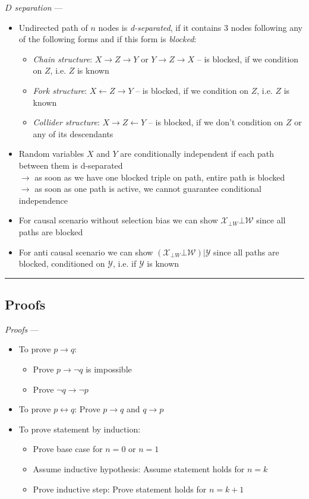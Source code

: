 \emph{$D$ separation} --- 
\begin{itemize}
    \item Undirected path of $n$ nodes is \emph{d-separated}, if it contains 3 nodes following any of the following forms and if this form is \emph{blocked}: 
    \begin{itemize}
        \item \emph{Chain structure}: $X \rightarrow Z \rightarrow Y$ or $Y \rightarrow Z \rightarrow X$ – is blocked, if we condition on $Z$, i.e. $Z$ is known
        \item \emph{Fork structure}: $X \leftarrow Z \rightarrow Y$ – is blocked, if we condition on $Z$, i.e. $Z$ is known
        \item \emph{Collider structure}: $X \rightarrow Z \leftarrow Y$ – is blocked, if we don't condition on $Z$ or any of its descendants
    \end{itemize}
    \item Random variables $X$ and $Y$ are conditionally independent if each path between them is d-separated\\
    $\rightarrow$ as soon as we have one blocked triple on path, entire path is blocked\\
    $\rightarrow$ as soon as one path is active, we cannot guarantee conditional independence
    \item For causal scenario without selection bias we can show $\mathcal{X}_{\bot W} \bot \mathcal{W}$ since all paths are blocked 
    \item For anti causal scenario we can show $(\mathcal{X}_{\bot W} \bot \mathcal{W}) | \mathcal{Y}$ since all paths are blocked, conditioned on $\mathcal{Y}$, i.e. if $\mathcal{Y}$ is known
\end{itemize}

{\color{black}\hrule height 0.001mm}

\subsection*{Proofs}

\emph{Proofs} --- 
\begin{itemize}
    \item To prove $p \rightarrow q$:
    \begin{itemize}
        \item Prove $p \rightarrow \neg q$ is impossible
        \item Prove $\neg q \rightarrow \neg p$
    \end{itemize}
    \item To prove $p \leftrightarrow q$: Prove $p \rightarrow q$ and $q \rightarrow p$
    \item To prove statement by induction: 
    \begin{itemize}
        \item Prove base case for $n=0$ or $n=1$
        \item Assume inductive hypothesis: Assume statement holds for $n=k$
        \item Prove inductive step: Prove statement holds for $n=k+1$
    \end{itemize}
\end{itemize}

